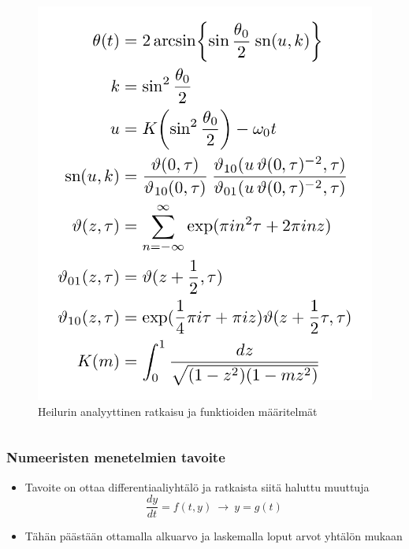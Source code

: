 \documentclass[finnish, 11pt, fleqn]{beamer}
\begin{document}
\begin{frame}
\begin{columns}[onlytextwidth]
\begin{column}{.55\textwidth}
\begin{figure}[h!]
				\includegraphics[scale=0.25]{graphics/kaava.png}
				{\caption{Heilurin analyyttinen ratkaisu ja funktioiden määritelmät}}
			\end{figure}
		\end{column}
	\end{columns}
	
\end{frame}

\begin{frame}
    \frametitle{Numeeristen menetelmien tavoite}
	\begin{itemize}
    	\vspace{-2em}
    	\item{Tavoite on ottaa differentiaaliyhtälö ja ratkaista siitä haluttu muuttuja}
    	\vspace{1em}
    	$$\dfrac{dy}{dt} = f(t, y) \: \rightarrow \: y = g(t)$$
    	\vspace{0.5 em}
    	\item{Tähän päästään ottamalla alkuarvo ja laskemalla loput arvot yhtälön mukaan}
    \end{itemize}
\end{frame}
\end{document}
